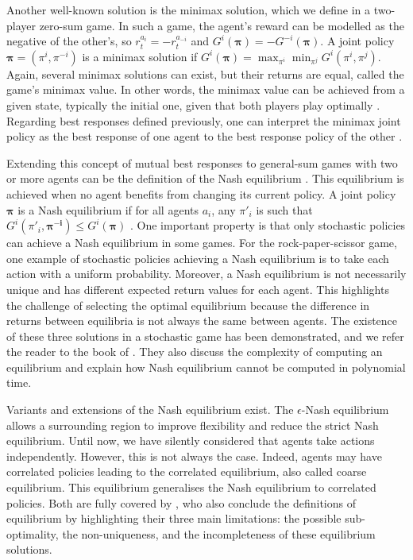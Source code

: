 Another well-known solution is the minimax solution, which we define in a two-player zero-sum game.
In such a game, the agent's reward can be modelled as the negative of the other's, so $r_t^{a_i} = -r_t^{a_{-i}}$ and $G^i(\mathbf{\pi}) = - G^{-i}(\mathbf{\pi})$.
A joint policy $\mathbf{\pi} = (\pi^i, \pi^{-i})$ is a minimax solution if $G^i(\mathbf{\pi})=\max_{\pi^i} \min_{\pi^j} G^i(\pi^i, \pi^j)$.
Again, several minimax solutions can exist, but their returns are equal, called the game's minimax value.
In other words, the minimax value can be achieved from a given state, typically the initial one, given that both players play optimally \citep{russel2010}.
Regarding best responses defined previously, one can interpret the minimax joint policy as the best response of one agent to the best response policy of the other \citep{marl-book}.

Extending this concept of mutual best responses to general-sum games with two or more agents can be the definition of the Nash equilibrium \citep{marl-book}.
This equilibrium is achieved when no agent benefits from changing its current policy.
A joint policy $\mathbf{\pi}$ is a Nash equilibrium if for all agents $a_i$, any $\pi'_i$ is such that $G^i(\pi'_i , \mathbf{\pi^{-i}}) \le G^i(\mathbf{\pi})$ \citep{nash1950equilibrium}.
One important property is that only stochastic policies can achieve a Nash equilibrium in some games.
For the rock-paper-scissor game, one example of stochastic policies achieving a Nash equilibrium is to take each action with a uniform probability.
Moreover, a Nash equilibrium is not necessarily unique and has different expected return values for each agent.
This highlights the challenge of selecting the optimal equilibrium because the difference in returns between equilibria is not always the same between agents.
The existence of these three solutions in a stochastic game has been demonstrated, and we refer the reader to the book of \cite{marl-book}.
They also discuss the complexity of computing an equilibrium and explain how Nash equilibrium cannot be computed in polynomial time.

Variants and extensions of the Nash equilibrium exist.
The $\epsilon$-Nash equilibrium allows a surrounding region to improve flexibility and reduce the strict Nash equilibrium.
Until now, we have silently considered that agents take actions independently.
However, this is not always the case.
Indeed, agents may have correlated policies leading to the correlated equilibrium, also called coarse equilibrium.
This equilibrium generalises the Nash equilibrium to correlated policies.
Both are fully covered by \cite{marl-book}, who also conclude the definitions of equilibrium by highlighting their three main limitations: the possible sub-optimality, the non-uniqueness, and the incompleteness of these equilibrium solutions.


